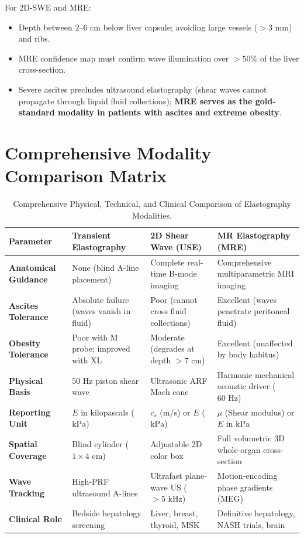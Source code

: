 \documentclass[11pt,a4paper]{article}
\begin{document}
For 2D-SWE and MRE:
\begin{itemize}
    \item Depth between $2\text{--}6\text{ cm}$ below liver capsule; avoiding large vessels ($> 3\text{ mm}$) and ribs.
    \item MRE confidence map must confirm wave illumination over $> 50\%$ of the liver cross-section.
    \item Severe ascites precludes ultrasound elastography (shear waves cannot propagate through liquid fluid collections); \textbf{MRE serves as the gold-standard modality in patients with ascites and extreme obesity}.
\end{itemize}

\section{Comprehensive Modality Comparison Matrix}

\begin{table}[htbp]
\centering
\small
\setlength{\tabcolsep}{2.5pt}
\caption{Comprehensive Physical, Technical, and Clinical Comparison of Elastography Modalities.}
\label{tab:comprehensive_matrix}
\begin{tabular}{p{2.6cm} p{3.6cm} p{3.8cm} p{4.6cm}}
\toprule
\textbf{Parameter} & \textbf{Transient Elastography} & \textbf{2D Shear Wave (USE)} & \textbf{MR Elastography (MRE)} \\
\midrule
\textbf{Anatomical Guidance} & None (blind A-line placement) & Complete real-time B-mode imaging & Comprehensive multiparametric MRI imaging \\
\addlinespace
\textbf{Ascites Tolerance} & Absolute failure (waves vanish in fluid) & Poor (cannot cross fluid collections) & Excellent (waves penetrate peritoneal fluid) \\
\addlinespace
\textbf{Obesity Tolerance} & Poor with M probe; improved with XL & Moderate (degrades at depth $> 7\text{ cm}$) & Excellent (unaffected by body habitus) \\
\addlinespace
\textbf{Physical Basis} & $50\text{ Hz}$ piston shear wave & Ultrasonic ARF Mach cone & Harmonic mechanical acoustic driver ($60\text{ Hz}$) \\
\addlinespace
\textbf{Reporting Unit} & $E$ in kilopascals ($\text{kPa}$) & $c_s$ ($\text{m/s}$) or $E$ ($\text{kPa}$) & $\mu$ (Shear modulus) or $E$ in $\text{kPa}$ \\
\addlinespace
\textbf{Spatial Coverage} & Blind cylinder ($1 \times 4\text{ cm}$) & Adjustable 2D color box & Full volumetric 3D whole-organ cross-section \\
\addlinespace
\textbf{Wave Tracking} & High-PRF ultrasound A-lines & Ultrafast plane-wave US ($> 5\text{ kHz}$) & Motion-encoding phase gradients (MEG) \\
\addlinespace
\textbf{Clinical Role} & Bedside hepatology screening & Liver, breast, thyroid, MSK & Definitive hepatology, NASH trials, brain \\
\bottomrule
\end{tabular}
\end{table}
\end{document}
